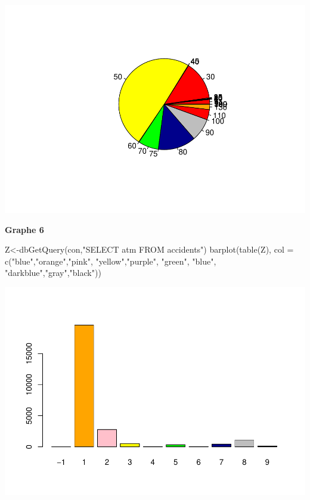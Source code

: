 \documentclass[mstat,12pt]{unswthesis}
\newenvironment{Shaded}{\begin{snugshade}}{\end{snugshade}}
\newcommand{\AttributeTok}[1]{\textcolor[rgb]{0.77,0.63,0.00}{#1}}
\newcommand{\FunctionTok}[1]{\textcolor[rgb]{0.00,0.00,0.00}{#1}}
\newcommand{\NormalTok}[1]{#1}
\newcommand{\OtherTok}[1]{\textcolor[rgb]{0.56,0.35,0.01}{#1}}
\newcommand{\StringTok}[1]{\textcolor[rgb]{0.31,0.60,0.02}{#1}}
\begin{document}
\includegraphics{rapport-G04_files/figure-latex/unnamed-chunk-16-1.pdf}

\medskip

\textbf{Graphe 6 }

\begin{Shaded}
\begin{Highlighting}[]
\NormalTok{Z}\OtherTok{\textless{}{-}}\FunctionTok{dbGetQuery}\NormalTok{(con,}\StringTok{"SELECT atm}
\StringTok{FROM accidents"}\NormalTok{)}
\FunctionTok{barplot}\NormalTok{(}\FunctionTok{table}\NormalTok{(Z), }\AttributeTok{col =} \FunctionTok{c}\NormalTok{(}\StringTok{"blue"}\NormalTok{,}\StringTok{"orange"}\NormalTok{,}\StringTok{"pink"}\NormalTok{, }\StringTok{"yellow"}\NormalTok{,}\StringTok{"purple"}\NormalTok{, }\StringTok{"green"}\NormalTok{,}
                          \StringTok{"blue"}\NormalTok{, }\StringTok{"darkblue"}\NormalTok{,}\StringTok{"gray"}\NormalTok{,}\StringTok{"black"}\NormalTok{))}
\end{Highlighting}
\end{Shaded}

\includegraphics{rapport-G04_files/figure-latex/unnamed-chunk-17-1.pdf}
\end{document}
